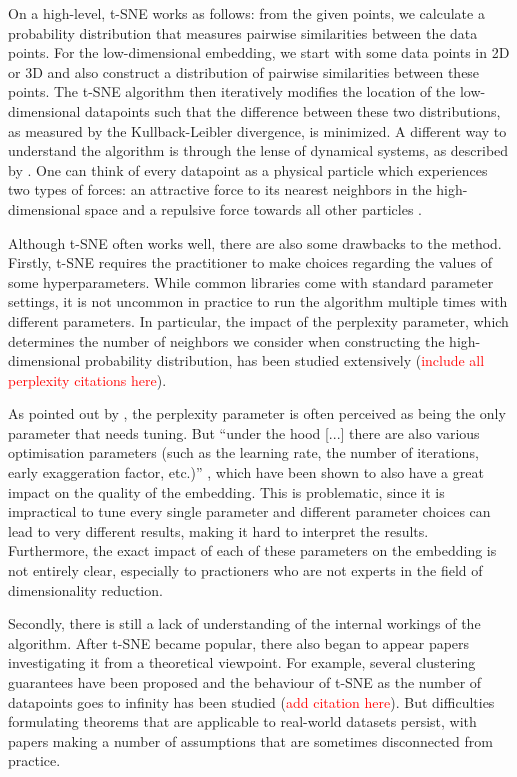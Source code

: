 On a high-level, t-SNE works as follows: from the given points, we calculate a probability distribution that measures pairwise similarities between the data points. 
For the low-dimensional embedding, we start with some data points in 2D or 3D and also construct a distribution of pairwise similarities between these points. 
The t-SNE algorithm then iteratively modifies the location of the low-dimensional datapoints such that the difference between these two distributions, as measured by the Kullback-Leibler divergence, is minimized. 
A different way to understand the algorithm is through the lense of dynamical systems, as described by \cite{LinStei22}. 
One can think of every datapoint as a physical particle which experiences two types of forces: an attractive force to its nearest neighbors in the high-dimensional space and a repulsive force towards all other particles \cite{KoBe19SingleCell}. 

Although t-SNE often works well, there are also some drawbacks to the method. 
Firstly, t-SNE requires the practitioner to make choices regarding the values of some hyperparameters. 
While common libraries \cite{openTSNE, sklearn_api} come with standard parameter settings, it is not uncommon in practice to run the algorithm multiple times with different parameters. 
In particular, the impact of the perplexity parameter, which determines the number of neighbors we consider when constructing the high-dimensional probability distribution, has been studied extensively (\textcolor{red}{include all perplexity citations here}). 

As pointed out by \cite{KoBe19SingleCell}, the perplexity parameter is often perceived as being the only parameter that needs tuning. 
But \enquote{under the hood [...] there are also
various optimisation parameters (such as the learning rate, the
number of iterations, early exaggeration factor, etc.)} \cite{KoBe19SingleCell}, which have been shown to also have a great impact on the quality of the embedding. 
This is problematic, since it is impractical to tune every single parameter and different parameter choices can lead to very different results, making it hard to interpret the results. 
Furthermore, the exact impact of each of these parameters on the embedding is not entirely clear, especially to practioners who are not experts in the field of dimensionality reduction. 


Secondly, there is still a lack of understanding of the internal workings of the algorithm. 
After t-SNE became popular, there also began to appear papers investigating it from a theoretical viewpoint. 
For example, several clustering guarantees have been proposed and the behaviour of t-SNE as the number of datapoints goes to infinity has been studied (\textcolor{red}{add citation here}). 
But difficulties formulating theorems that are applicable to real-world datasets persist, with papers making a number of assumptions that are sometimes disconnected from practice. 

